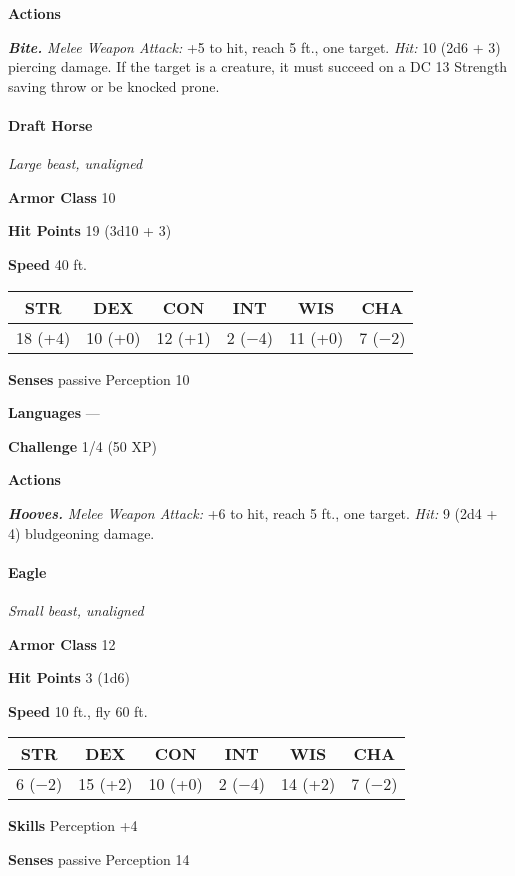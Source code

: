 \documentclass[
]{article}
\begin{document}
\textbf{Actions}

\emph{\textbf{Bite.}} \emph{Melee Weapon Attack:} +5 to hit, reach 5
ft., one target. \emph{Hit:} 10 (2d6 + 3) piercing damage. If the target
is a creature, it must succeed on a DC 13 Strength saving throw or be
knocked prone.

\hypertarget{draft-horse}{%
\paragraph{Draft Horse}\label{draft-horse}}

\emph{Large beast, unaligned}

\textbf{Armor Class} 10

\textbf{Hit Points} 19 (3d10 + 3)

\textbf{Speed} 40 ft.

\begin{longtable}[]{@{}cccccc@{}}
\toprule
STR & DEX & CON & INT & WIS & CHA\tabularnewline
\midrule
\endhead
18 (+4) & 10 (+0) & 12 (+1) & 2 (−4) & 11 (+0) & 7 (−2)\tabularnewline
\bottomrule
\end{longtable}

\textbf{Senses} passive Perception 10

\textbf{Languages} ---

\textbf{Challenge} 1/4 (50 XP)

\textbf{Actions}

\emph{\textbf{Hooves.}} \emph{Melee Weapon Attack:} +6 to hit, reach 5
ft., one target. \emph{Hit:} 9 (2d4 + 4) bludgeoning damage.

\hypertarget{eagle}{%
\paragraph{Eagle}\label{eagle}}

\emph{Small beast, unaligned}

\textbf{Armor Class} 12

\textbf{Hit Points} 3 (1d6)

\textbf{Speed} 10 ft., fly 60 ft.

\begin{longtable}[]{@{}cccccc@{}}
\toprule
STR & DEX & CON & INT & WIS & CHA\tabularnewline
\midrule
\endhead
6 (−2) & 15 (+2) & 10 (+0) & 2 (−4) & 14 (+2) & 7 (−2)\tabularnewline
\bottomrule
\end{longtable}

\textbf{Skills} Perception +4

\textbf{Senses} passive Perception 14
\end{document}
